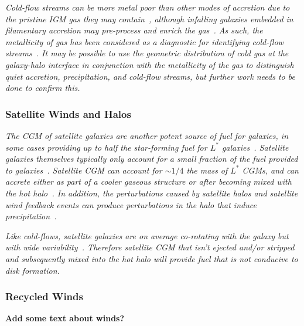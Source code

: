 \documentclass[fleqn,usenatbib]{mnras}
\begin{document}
\textit{
Cold-flow streams can be more metal poor than other modes of accretion due to the pristine IGM gas they may contain~\citep[e.g.][]{Hafen2019, Wright2021}, although infalling galaxies embedded in filamentary accretion may pre-process and enrich the gas~\citep[e.g.][]{Hafen2019}.
As such, the metallicity of gas has been considered as a diagnostic for identifying cold-flow streams~\citep[e.g.][]{Hafen2016}.
It may be possible to use the geometric distribution of cold gas at the galaxy-halo interface in conjunction with the metallicity of the gas to distinguish quiet accretion, precipitation, and cold-flow streams, but further work needs to be done to confirm this.
}

\subsubsection{Satellite Winds and Halos}
\label{s: modes -- satellite}

\textit{
The CGM of satellite galaxies are another potent source of fuel for galaxies, in some cases providing up to half the star-forming fuel for $L^*$ galaxies~\citep[intergalactic transfer; ][]{Angles-Alcazar2017}.
Satellite galaxies themselves typically only account for a small fraction of the fuel provided to galaxies~\citep{Angles-Alcazar2017}. 
Satellite CGM can account for $\sim1/4$ the mass of $L^*$ CGMs, and can accrete either as part of a cooler gaseous structure or after becoming mixed with the hot halo~\citep{Hafen2019, Hafen2020}.
In addition, the perturbations caused by satellite halos and satellite wind feedback events can produce perturbations in the halo that induce precipitation~\citep{Esmerian2020}.
}

\textit{
Like cold-flows, satellite galaxies are on average co-rotating with the galaxy but with wide variability~\citep[e.g.][]{Stewart2011, Hafen2019}.
Therefore satellite CGM that isn't ejected and/or stripped and subsequently mixed into the hot halo will provide fuel that is not conducive to disk formation.
}

\subsubsection{Recycled Winds}
\label{s: modes -- winds}

\textbf{Add some text about winds?}

\end{document}
